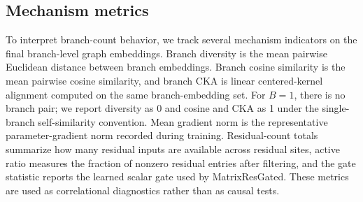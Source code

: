 \subsection{Mechanism metrics}

To interpret branch-count behavior, we track several mechanism indicators on the final branch-level graph embeddings. Branch diversity is the mean pairwise Euclidean distance between branch embeddings. Branch cosine similarity is the mean pairwise cosine similarity, and branch CKA is linear centered-kernel alignment computed on the same branch-embedding set. For \(B=1\), there is no branch pair; we report diversity as 0 and cosine and CKA as 1 under the single-branch self-similarity convention. Mean gradient norm is the representative parameter-gradient norm recorded during training. Residual-count totals summarize how many residual inputs are available across residual sites, active ratio measures the fraction of nonzero residual entries after filtering, and the gate statistic reports the learned scalar gate used by MatrixResGated. These metrics are used as correlational diagnostics rather than as causal tests.
 